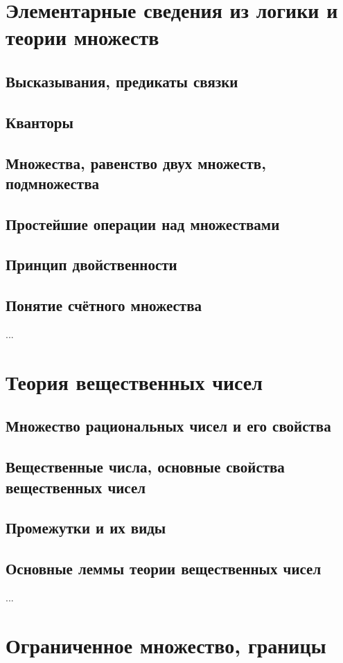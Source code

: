 \section{Элементарные сведения из логики и теории множеств}
\subsection{Высказывания, предикаты связки}
\subsection{Кванторы}
\subsection{Множества, равенство двух множеств, подмножества}
\subsection{Простейшие операции над множествами}
\subsection{Принцип двойственности}
\subsection{Понятие счётного множества}
...

\section{Теория вещественных чисел}
\subsection{Множество рациональных чисел и его свойства}
\subsection{Вещественные числа, основные свойства вещественных чисел}
\subsection{Промежутки и их виды}
\subsection{Основные леммы теории вещественных чисел}
...

\section{Ограниченное множество, границы}
